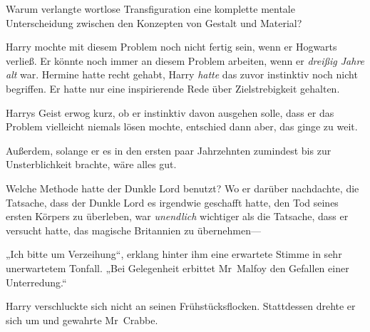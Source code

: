 Warum verlangte wortlose Transfiguration eine komplette mentale Unterscheidung zwischen den Konzepten von Gestalt und Material?

Harry mochte mit diesem Problem noch nicht fertig sein, wenn er Hogwarts verließ. Er könnte noch immer an diesem Problem arbeiten, wenn er \emph{dreißig Jahre alt} war. Hermine hatte recht gehabt, Harry \emph{hatte} das zuvor instinktiv noch nicht begriffen. Er hatte nur eine inspirierende Rede über Zielstrebigkeit gehalten.

Harrys Geist erwog kurz, ob er instinktiv davon ausgehen solle, dass er das Problem vielleicht niemals lösen mochte, entschied dann aber, das ginge zu weit.

Außerdem, solange er es in den ersten paar Jahrzehnten zumindest bis zur Unsterblichkeit brachte, wäre alles gut.

Welche Methode hatte der Dunkle Lord benutzt? Wo er darüber nachdachte, die Tatsache, dass der Dunkle Lord es irgendwie geschafft hatte, den Tod seines ersten Körpers zu überleben, war \emph{unendlich} wichtiger als die Tatsache, dass er versucht hatte, das magische Britannien zu übernehmen—

„Ich bitte um Verzeihung“, erklang hinter ihm eine erwartete Stimme in sehr unerwartetem Tonfall. „Bei Gelegenheit erbittet Mr~Malfoy den Gefallen einer Unterredung.“

Harry verschluckte sich nicht an seinen Frühstücksflocken. Stattdessen drehte er sich um und gewahrte Mr~Crabbe.


